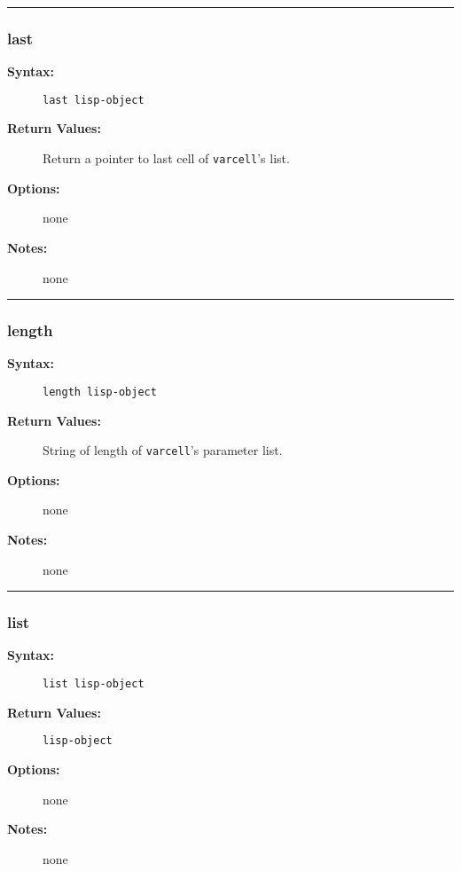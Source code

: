 \hrule
\subsubsection{last}

\begin{description}
\item[{\bf Syntax:}] \mbox{}

{\tt last lisp-object}

\item[{\bf Return Values:}] \mbox{}

Return a pointer to last cell of 
{\tt varcell}'s list.

\item[{\bf Options:}] \mbox{}

none  

\item[{\bf Notes:}] \mbox{}

none

\end{description}


\hrule
\subsubsection{length}

\begin{description}
\item[{\bf Syntax:}] \mbox{}

{\tt length lisp-object}

\item[{\bf Return Values:}] \mbox{}

String of length of {\tt varcell}'s 
parameter list.

\item[{\bf Options:}] \mbox{}

none  

\item[{\bf Notes:}] \mbox{}

none  

\end{description}


\hrule
\subsubsection{list}

\begin{description}
\item[{\bf Syntax:}] \mbox{}

{\tt list lisp-object}

\item[{\bf Return Values:}] \mbox{}

{\tt lisp-object}

\item[{\bf Options:}] \mbox{}

none  

\item[{\bf Notes:}] \mbox{}

none

\end{description}


